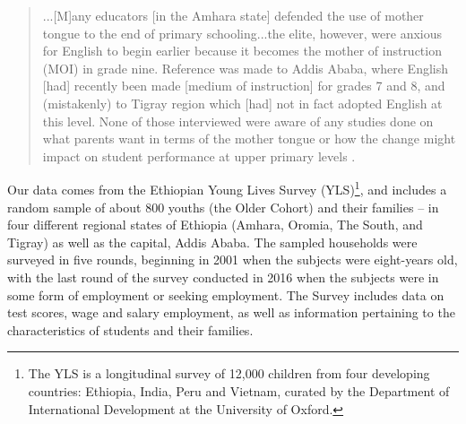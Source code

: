 \begin{quote}
    ...[M]any educators [in the Amhara state] defended the use of mother tongue to the end of primary schooling...the elite, however, were anxious for English to begin earlier because it becomes the mother of instruction (MOI) in grade nine. Reference was made to Addis Ababa, where English [had] recently been made [medium of instruction] for grades 7 and 8, and (mistakenly) to Tigray region which [had] not in fact adopted English at this level. None of those interviewed were aware of any studies done on what parents want in terms of the mother tongue or how the change might impact on student performance at upper primary levels \citep[][p.~63]{Heugh2007}.
\end{quote}




Our data comes from the Ethiopian Young Lives Survey (YLS)\footnote{The YLS is a longitudinal survey of 12,000 children from four developing countries: Ethiopia, India, Peru and Vietnam, curated by the Department of International Development at the University of Oxford.}, and includes a random sample of about 800 youths (the Older Cohort) and their families – in four different regional states of Ethiopia (Amhara, Oromia, The South, and Tigray) as well as the capital, Addis Ababa. The sampled households were surveyed in five rounds, beginning in 2001 when the subjects were eight-years old, with the last round of the survey conducted in 2016 when the subjects were in some form of employment or seeking employment. The Survey includes data on test scores, wage and salary employment, as well as information pertaining to the characteristics of students and their families.

